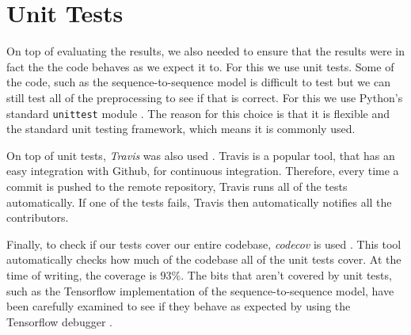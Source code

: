 


\section{Unit Tests}

On top of evaluating the results, we also needed to ensure that the results were in fact the the code behaves as we expect it to.
For this we use unit tests.
Some of the code, such as the sequence-to-sequence model is difficult to test but we can still test all of the preprocessing to see if that is correct.
For this we use Python's standard \texttt{unittest} module \cite{python_unittest_documentation}.
The reason for this choice is that it is flexible and the standard unit testing framework, which means it is commonly used.

On top of unit tests, \textit{Travis} was also used \cite{travis}.
Travis is a popular tool, that has an easy integration with Github, for continuous integration.
Therefore, every time a commit is pushed to the remote repository, Travis runs all of the tests automatically.
If one of the tests fails, Travis then automatically notifies all the contributors.

Finally, to check if our tests cover our entire codebase, \textit{codecov} is used \cite{codecov}.
This tool automatically checks how much of the codebase all of the unit tests cover.
At the time of writing, the coverage is $93\%$.
The bits that aren't covered by unit tests, such as the Tensorflow implementation of the sequence-to-sequence model, have been carefully examined to see if they behave as expected by using the Tensorflow debugger \cite{tensorflow}.
